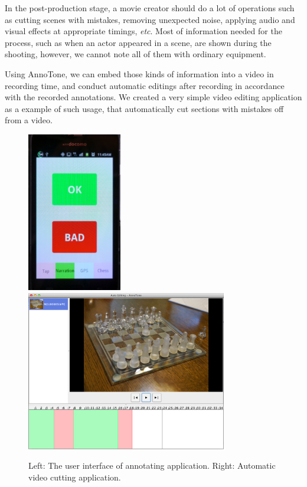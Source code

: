 In the post-production stage, a movie creator should do a lot of operations such as cutting scenes with mistakes, removing unexpected noise, applying audio and visual effects at appropriate timings, {\it etc}.
Most of information needed for the process, such as when an actor appeared in a scene, are shown during the shooting, however, we cannot note all of them with ordinary equipment.

Using AnnoTone, we can embed those kinds of information into a video in recording time, and conduct automatic editings after recording in accordance with the recorded annotations.
We created a very simple video editing application as a example of such usage, that automatically cut sections with mistakes off from a video.

\begin{figure}[htbp]
 \begin{center}
  \includegraphics[height=70mm]{application_edit_app.png}
  \includegraphics[height=70mm]{application_edit.png}
 \end{center}
 \caption{Left: The user interface of annotating application. Right: Automatic video cutting application.}
 \label{fig:appl_edit}
\end{figure}

